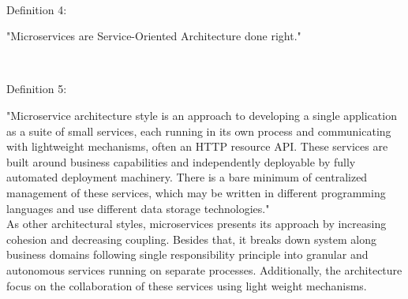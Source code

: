 \\
\begin{shaded}Definition 4: \cite{Fowler:2014aa}\cite{Radchenko:2015aa}\end{shaded}
"Microservices are Service-Oriented Architecture done right."


\\
\begin{shaded}Definition 5: \cite{Fowler:2014aa}\end{shaded}
"Microservice architecture style is an approach to developing a single application as a suite of small services, each running in its own process and communicating with lightweight mechanisms, often an HTTP resource API. These services are built around business capabilities and independently deployable by fully automated deployment machinery. There is a bare minimum of centralized management of these services, which may be written in different programming languages and use different data storage technologies."
\\
As other architectural styles, microservices presents its approach by increasing cohesion and decreasing coupling. Besides that, it breaks down system along business domains following single responsibility principle into granular and autonomous services running on separate processes. Additionally, the architecture focus on the collaboration of these services using light weight mechanisms.

